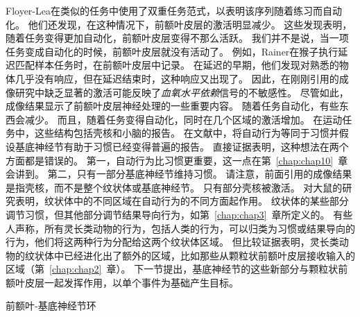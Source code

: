 Floyer-Lea\cite{floyer2004changing}在类似的任务中使用了双重任务范式，以表明该序列随着练习而自动化。
他们还发现，在这种情况下，前额叶皮层的激活明显减少。
这些发现表明，随着任务变得更加自动化，前额叶皮层变得不那么活跃。
我们并不是说，当一项任务变成自动化的时候，前额叶皮层就没有活动了。
例如，Rainer\cite{rainer2002timecourse}在猴子执行延迟匹配样本任务时，在前额叶皮层中记录。
在延迟的早期，他们发现对熟悉的物体几乎没有响应，但在延迟结束时，这种响应又出现了。
因此，在刚刚引用的成像研究中缺乏显著的激活可能反映了\textit{血氧水平依赖}信号的不敏感性。
尽管如此，成像结果显示了前额叶皮层神经处理的一些重要内容。
随着任务自动化，有些东西会减少。
而且，随着任务变得自动化，同时在几个区域的激活增加。
在运动任务中，这些结构包括壳核和小脑\cite{floyer2004changing,toni1998time}的报告。
在文献中，将自动行为等同于习惯并假设基底神经节有助于习惯已经变得普遍\cite{fernandez2001visual,broadbent2007rats}的报告。
直接证据表明，这种想法在两个方面都是错误的。
第一，自动行为比习惯更重要，这一点在第~\ref{chap:chap10}~章会讲到。
第二，只有一部分基底神经节维持习惯。
请注意，前面引用的成像结果是指壳核，而不是整个纹状体或基底神经节。
只有部分壳核被激活。
对大鼠的研究表明，纹状体中的不同区域在自动行为的不同方面起作用\cite{yin2008reward}。
纹状体的某些部分调节习惯，但其他部分调节结果导向行为，如第~\ref{chap:chap3}~章所定义的。
有些人声称，所有灵长类动物的行为，包括人类的行为，可以归类为习惯或结果导向的行为，他们将这两种行为分配给这两个纹状体区域\cite{balleine2010human}。
但比较证据表明，灵长类动物的纹状体中已经进化出了额外的区域，比如那些从颗粒状前额叶皮层接收输入的区域（第~\ref{chap:chap2}~章）。
下一节提出，基底神经节的这些新部分与颗粒状前额叶皮层一起发挥作用，以单个事件为基础产生目标。



前额叶-基底神经节环

